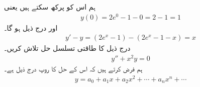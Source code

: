ہم اس کو پرکھ سکتے ہیں یعنی
\begin{align*}
y(0)=2e^0-1-0=2-1=1
\end{align*}
اور درج ذیل ہو گا۔
\begin{align*}
y'-y=(2e^x-1)-(2e^x-1-x)=x
\end{align*}
درج ذیل کا طاقتی تسلسل حل تلاش کریں۔
\begin{align}\label{مساوات_تسلسل_ابتدائی_قیمت_تسلسل_حل_الف}
y''+x^2y=0
\end{align}
ہم فرض کرتے ہیں کہ اس کے حل کا روپ  درج ذیل  ہے۔
\begin{align}\label{مساوات_تسلسل_ابتدائی_قیمت_تسلسل_حل_ب}
y=a_0+a_1x+a_2x^2+\cdots+a_nx^n+\cdots
\end{align}

